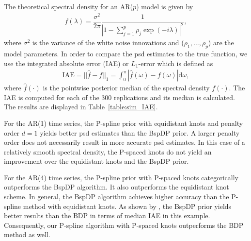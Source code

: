 \documentclass[twocolumn,final]{svjour3}
\begin{document}
The theoretical spectral density for an AR($p$) model is given by
\begin{align*}
f(\lambda) = \dfrac{\sigma^2}{2 \pi} \dfrac{1}{|1-\sum_{j=1}^{p}\rho_j \exp(-i \lambda)|^2},
\end{align*}
where $\sigma^2$ is the variance of the white noise innovations and ($\rho_1, \dots, \rho_p$) are the model parameters.  In order to compare the psd estimates  to the true function, we use the integrated absolute error (IAE) or $L_1$-error which is defined as
\begin{align*}
\text{IAE} = || \widehat{f} - f ||_1 = \int_{0}^{\pi} |\widehat{f}(\omega)-f(\omega)|\text{d}\omega,
\end{align*}
where $\widehat{f}(\cdot)$ is the pointwise posterior median of the spectral density $f(\cdot)$.   The IAE is computed for each of the 300 replications and its median is calculated.  
The results are displayed in Table~\ref{table:sim_IAE}.

For the AR(1) time series, the P-spline prior with equidistant knots and penalty order $d=1$ yields better psd estimates than the BspDP prior.
A larger penalty order does not necessarily result in more accurate psd estimates. In this case of a relatively smooth spectral density, the P-spaced knots do not yield an improvement over the equidistant knots and the BspDP prior.




For the AR(4) time series, the P-spline prior with P-spaced knots categorically outperforms the BspDP algorithm.  It also outperforms the equidistant knot scheme.  In general, the BspDP algorithm achieves higher accuracy than the P-spline method with equidistant knots.  As shown by \cite{Edwards2018}, the BspDP prior yields better results than the BDP in terms of median IAE in this example.  Consequently, our P-spline algorithm with P-spaced knots outperforms the BDP method as well.


\end{document}
